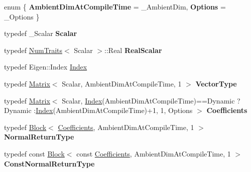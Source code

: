 \begin{DoxyCompactItemize}
\item 
\mbox{\label{class_eigen_1_1_hyperplane_a6be3e54ea53f7aca303ff9c73c3e4e14}} 
enum \{ {\bfseries Ambient\+Dim\+At\+Compile\+Time} = \+\_\+\+Ambient\+Dim, 
{\bfseries Options} = \+\_\+\+Options
 \}
\item 
\mbox{\label{class_eigen_1_1_hyperplane_af1aa9421d2b1343c424e675fcd9641c9}} 
typedef \+\_\+\+Scalar {\bfseries Scalar}
\item 
\mbox{\label{class_eigen_1_1_hyperplane_a4bf4955ffbff8fb96066f692d73a535e}} 
typedef \mbox{\hyperlink{struct_eigen_1_1_num_traits}{Num\+Traits}}$<$ Scalar $>$\+::Real {\bfseries Real\+Scalar}
\item 
typedef Eigen\+::\+Index \mbox{\hyperlink{class_eigen_1_1_hyperplane_a58d2307d16128a0026021374e9e10465}{Index}}
\item 
\mbox{\label{class_eigen_1_1_hyperplane_af948b12829ad66df7a5fbdd3dce5c483}} 
typedef \mbox{\hyperlink{class_eigen_1_1_matrix}{Matrix}}$<$ Scalar, Ambient\+Dim\+At\+Compile\+Time, 1 $>$ {\bfseries Vector\+Type}
\item 
\mbox{\label{class_eigen_1_1_hyperplane_adc54db10232ea442c4ded091e085ee10}} 
typedef \mbox{\hyperlink{class_eigen_1_1_matrix}{Matrix}}$<$ Scalar, \mbox{\hyperlink{class_eigen_1_1_hyperplane_a58d2307d16128a0026021374e9e10465}{Index}}(Ambient\+Dim\+At\+Compile\+Time)==Dynamic ? Dynamic \+:\mbox{\hyperlink{class_eigen_1_1_hyperplane_a58d2307d16128a0026021374e9e10465}{Index}}(Ambient\+Dim\+At\+Compile\+Time)+1, 1, Options $>$ {\bfseries Coefficients}
\item 
\mbox{\label{class_eigen_1_1_hyperplane_aa738ab4416b659b642497c6939f6bfbb}} 
typedef \mbox{\hyperlink{class_eigen_1_1_block}{Block}}$<$ \mbox{\hyperlink{class_eigen_1_1_matrix}{Coefficients}}, Ambient\+Dim\+At\+Compile\+Time, 1 $>$ {\bfseries Normal\+Return\+Type}
\item 
\mbox{\label{class_eigen_1_1_hyperplane_a3086b4e4a1db0904d6b4259db999da60}} 
typedef const \mbox{\hyperlink{class_eigen_1_1_block}{Block}}$<$ const \mbox{\hyperlink{class_eigen_1_1_matrix}{Coefficients}}, Ambient\+Dim\+At\+Compile\+Time, 1 $>$ {\bfseries Const\+Normal\+Return\+Type}
\end{DoxyCompactItemize}
